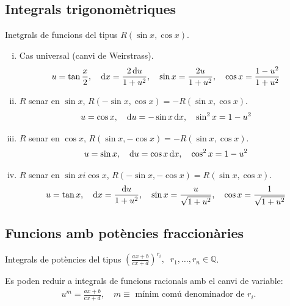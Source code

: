 \subsection{Integrals trigonomètriques}
Inetgrals de funcions del tipus $R(\sin x , \cos x)$.
\begin{enumerate}[i)]
    \item Cas universal (canvi de Weirstrass).
        \begin{align}
            u = \tan \frac{x}{2} , \quad \mathrm{d} x = \frac{2 \mathop{}\!\mathrm{d} u}{1 + u^{2}} , \quad \sin x = \frac{2u}{1 + u^{2}} , \quad \cos x = \frac{1 - u^{2}}{1 + u^{2}}
        \end{align}
    \item $R$ senar en $\sin x$, $R(- \sin x , \cos x) = -R(\sin x , \cos x)$.
        \begin{align}
            u = \cos x , \quad \mathrm{d} u = - \sin x \mathop{}\!\mathrm{d} x, \quad \sin^{2} x = 1 - u^{2}
        \end{align}
    \item $R$ senar en $\cos x$, $R(\sin x , - \cos x) = -R(\sin x , \cos x)$.
        \begin{align}
            u = \sin x , \quad \mathrm{d} u = \cos x \mathop{}\!\mathrm{d} x, \quad \cos^{2} x = 1 - u^{2}
        \end{align}
    \item $R$ senar en $\sin x i \cos x$, $R(- \sin x , - \cos x) = R(\sin x , \cos x)$.
        \begin{align}
            u = \tan x , \quad \mathrm{d} x = \frac{\mathrm{d} u}{1 + u^{2}} , \quad \sin x = \frac{u}{\sqrt{1 + u^{2}}} , \quad \cos x = \frac{1}{\sqrt{1 + u^{2}}}
        \end{align}
\end{enumerate}

\subsection{Funcions amb potències fraccionàries}
Integrals de potències del tipus $\displaystyle \left( \frac{ax + b}{cx + d} \right)^{r_{i}}, \; \; r_{1} , \dots , r_{n} \in \mathbb{Q}$.

Es poden reduir a integrals de funcions racionals amb el canvi de variable:
\begin{align}
    u^{m} = \frac{ax + b}{cx + d}, \quad m \equiv \text{ mínim comú denominador de $r_{i}$}.
\end{align}

